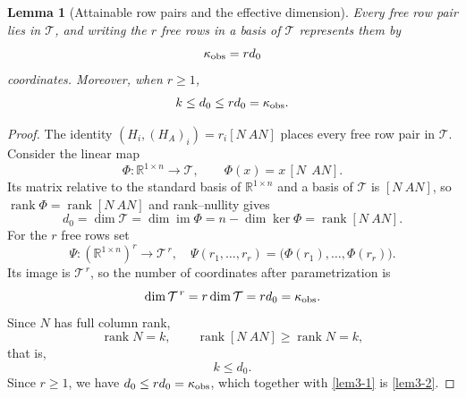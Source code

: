 \documentclass[journal]{IEEEtran}
\theoremstyle{plainn}
\newtheorem{lem}[thm]{Lemma}
\theoremstyle{remark}
\begin{document}
\begin{lem}[Attainable row pairs and the effective dimension]\label{lem:attainable}
Every free row pair lies in $\mathcal T$, and writing the $r$ free rows in a basis of $\mathcal T$ represents them by
\begin{equation}\label{eq:kappa}
\kappa_{\rm obs}=r d_0
\end{equation}
coordinates. Moreover, when $r\ge1$,
\begin{equation}\label{lem3-2}
k\le d_0\le rd_0=\kappa_{\rm obs}.
\end{equation}
\end{lem}

\begin{proof}
The identity $(H_i,(H_A)_i)=r_i[N\ AN]$ places every free row pair in $\mathcal T$. Consider the linear map
\begin{equation*}
\Phi:\mathbb R^{1\times n}\to\mathcal T,\qquad \Phi(x)=x\,[N\ \ AN].
\end{equation*}
Its matrix relative to the standard basis of $\mathbb R^{1\times n}$ and a basis of $\mathcal T$ is $[N\ AN]$, so $\operatorname{rank}\Phi=\operatorname{rank}[N\ AN]$ and rank--nullity gives
\begin{equation*}
d_0=\dim\mathcal T=\dim\operatorname{im}\Phi=n-\dim\ker\Phi=\operatorname{rank}[N\ AN].
\end{equation*}
For the $r$ free rows set
\begin{equation*}
\Psi:(\mathbb R^{1\times n})^r\to\mathcal T^{\,r},\quad
\Psi(r_1,\dots,r_r)=\bigl(\Phi(r_1),\dots,\Phi(r_r)\bigr).
\end{equation*}
Its image is $\mathcal T^{\,r}$, so the number of coordinates after parametrization is
\begin{equation*}
\dim\mathcal T^{\,r}=r\dim\mathcal T=rd_0=\kappa_{\rm obs}.
\end{equation*}
Since $N$ has full column rank,
\begin{equation*}
\operatorname{rank}N=k,\qquad \operatorname{rank}[N\ AN]\ge\operatorname{rank}N=k,
\end{equation*}
that is,
\begin{equation}\label{lem3-1}
k\le d_0 .
\end{equation}
Since $r\ge1$, we have $d_0\le rd_0=\kappa_{\rm obs}$, which together with \eqref{lem3-1} is \eqref{lem3-2}.
\end{proof}
\end{document}
